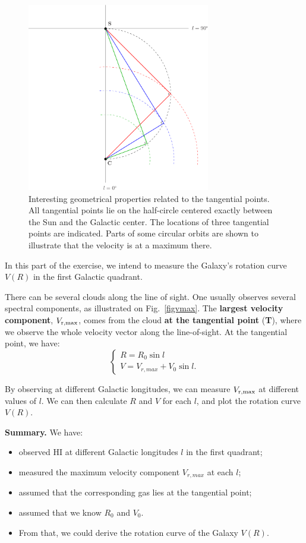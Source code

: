 \begin{figure}[ht]
\begin{center}
\includegraphics[width=8cm]{../figures/tangenter.pdf}
\end{center}
\caption{Interesting geometrical properties related to the tangential points. 
All tangential points lie on the half-circle centered exactly between the Sun and the Galactic center. 
The locations of three tangential points are indicated. 
Parts of some circular orbits are shown to illustrate that the velocity is at a maximum there.}
\label{tang_point}
\end{figure}
In this part of the exercise, we intend to measure the Galaxy's rotation
curve $V(R)$ in the first Galactic quadrant.

There can be several clouds along the line of sight. One usually
observes several spectral components, as illustrated on
Fig.~\ref{figvmax}.  The {\bf largest velocity component}, $V_{\rm
r,max}$, comes from the cloud {\bf at the tangential point} ({\bf T}),
where we observe the whole velocity vector along the line-of-sight. At
the tangential point, we have:
\begin{equation}
\left\{ 
\begin{array}{l}
R = R_0 \sin l \\
V = V_{r,max} + V_0 \sin l .
\end{array}
\right.
\label{eq-rv}
\end{equation}

By observing at different Galactic longitudes, we can measure
$V_{\rm r,max}$ at different values of $l$. We can then
calculate $R$ and $V$ for each $l$, and plot the rotation curve
$V(R)$.

\bigskip
{\bf Summary. } We have: 
\begin{itemize}
\item{observed HI at different Galactic longitudes $l$ in the first quadrant;}
\item{measured the maximum velocity component $V_{r,max}$ at each $l$;}
\item{assumed that the corresponding gas lies at the tangential point;}
\item{assumed that we know $R_0$ and $V_0$.}
\item{From that, we could derive the rotation curve of the Galaxy $V(R)$}. 
\end{itemize}

